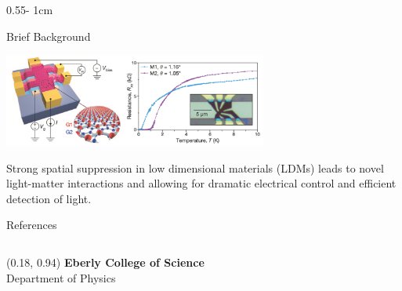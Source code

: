 \documentclass{../psuposter}
\begin{document}
\begin{frame}
\begin{columns}[t, totalwidth=\textwidth]
\begin{column}{0.55\textwidth - 1cm}
\begin{block}{Brief Background}
        \begin{center}
		   	\includegraphics[width=0.65\textwidth]{images/background}    		
    	\end{center}
		Strong spatial suppression in low dimensional materials (LDMs) leads to novel light-matter interactions and allowing for dramatic electrical control and efficient detection of light. \cite{xiaTwodimensionalMaterialNanophotonics2014}  

    \end{block}


    \begin{block}{References}
        
%        
		
    \end{block}

\end{column}
\end{columns}


\begin{textblock}{0.5}(0.18, 0.94)
    \color{white}
    \sffamily
    \textbf{Eberly College of Science}
    \\
    Department of Physics
\end{textblock}


\end{frame}
\end{document}
